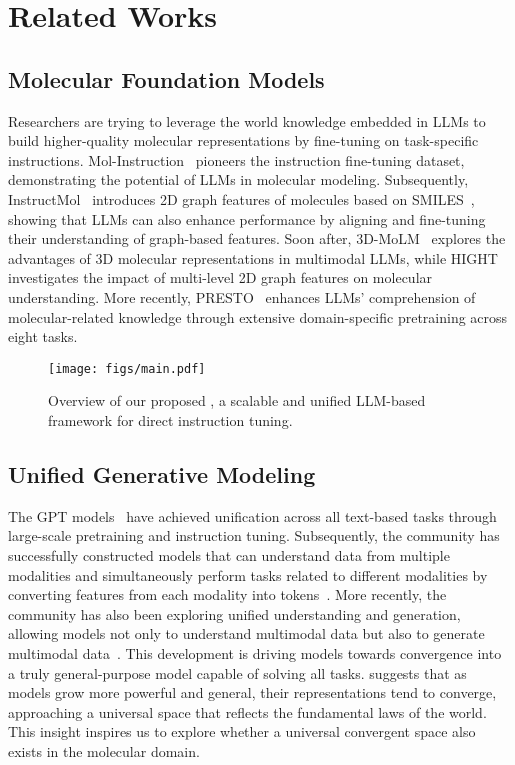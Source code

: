 \section{Related Works}
\subsection{Molecular Foundation Models}
Researchers are trying to leverage the world knowledge embedded in LLMs to build higher-quality molecular representations by fine-tuning on task-specific instructions.
Mol-Instruction~\cite{fang2024molinstructions} pioneers the instruction fine-tuning dataset, demonstrating the potential of LLMs in molecular modeling. Subsequently, InstructMol~\cite{cao2023instructmol} introduces 2D graph features of molecules based on SMILES~\cite{weininger1988smiles}, showing that LLMs can also enhance performance by aligning and fine-tuning their understanding of graph-based features. Soon after, 3D-MoLM~\cite{li2024towards} explores the advantages of 3D molecular representations in multimodal LLMs, while HIGHT~\cite{chen2024hight} investigates the impact of multi-level 2D graph features on molecular understanding. More recently, PRESTO~\cite{cao-etal-2024-presto} enhances LLMs' comprehension of molecular-related knowledge through extensive domain-specific pretraining across eight tasks. 

\begin{figure*}[t]
    \centering
    \texttt{[image: figs/main.pdf]} 
    \vspace{-0.3cm}
    \caption{Overview of our proposed \method, a scalable and unified LLM-based framework for direct instruction tuning.}
    \label{fig:main fig}
\end{figure*}

\subsection{Unified Generative Modeling}
The GPT models~\cite{brown2020language, achiam2023gpt} have achieved unification across all text-based tasks through large-scale pretraining and instruction tuning. Subsequently, the community has successfully constructed models that can understand data from multiple modalities and simultaneously perform tasks related to different modalities by converting features from each modality into tokens~\cite{alayrac2022flamingo,li2022blip,li2023blip,dai2023instructblip,liu2024visual}. More recently, the community has also been exploring unified understanding and generation, allowing models not only to understand multimodal data but also to generate multimodal data~\cite{zhu2023minigpt4,zheng2023minigpt5,koh2024generating}. This development is driving models towards convergence into a truly general-purpose model capable of solving all tasks. \citet{huh2024platonic} suggests that as models grow more powerful and general, their representations tend to converge, approaching a universal space that reflects the fundamental laws of the world. 
This insight inspires us to explore whether a universal convergent space also exists in the molecular domain.